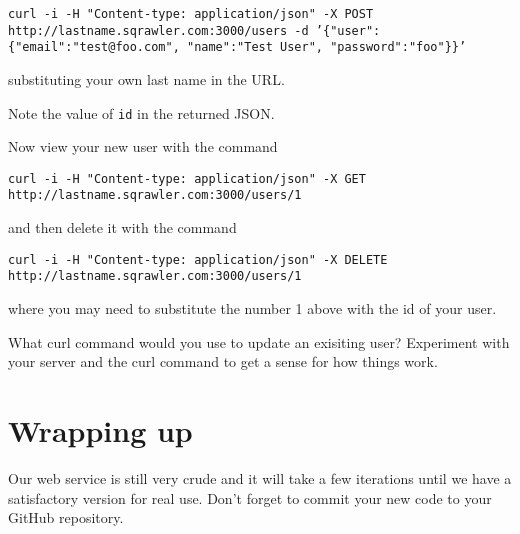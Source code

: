 \documentclass{article}
\begin{document}
\texttt{curl -i -H "Content-type: application/json" -X POST http://lastname.sqrawler.com:3000/users -d '\{"user": \{"email":"test@foo.com", "name":"Test User", "password":"foo"\}\}'}
  
substituting your own last name in the URL.

Note the value of \texttt{id} in the returned JSON.

Now view your new user with the command

\texttt{curl -i -H "Content-type: application/json" -X GET http://lastname.sqrawler.com:3000/users/1}

and then delete it with the command

\texttt{curl -i -H "Content-type: application/json" -X DELETE http://lastname.sqrawler.com:3000/users/1}

where you may need to substitute the number 1 above with the id of your user.

What curl command would you use to update an exisiting user?  Experiment with your server and the curl command to get a sense for how things work.

\section{Wrapping up}
Our web service is still very crude and it will take a few iterations until we have a satisfactory version for real use.  Don't forget to commit your new code to your GitHub repository.
\end{document}
